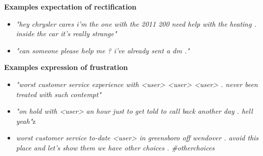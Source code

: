 \textbf{Examples expectation of rectification}
\begin{itemize}
    \item[\textbullet]\textit{"hey chrysler cares i'm the one with the 2011 200 need help with the heating . inside the car it's really strange"}
    \item[\textbullet]\textit{"can someone please help me ? i've already sent a dm ."}
\end{itemize}
\textbf{Examples expression of frustration}
\begin{itemize}
    \item[\textbullet]\textit{"worst customer service experience with <user> <user> <user> . never been treated with such contempt"}
    \item[\textbullet]\textit{"on hold with <user> an hour just to get told to call back another day . hell yeah"}z
    \item[\textbullet]\textit{worst customer service to-date <user> in greensboro off wendover . avoid this place and let's show them we have other choices . \#otherchoices}
\end{itemize}


